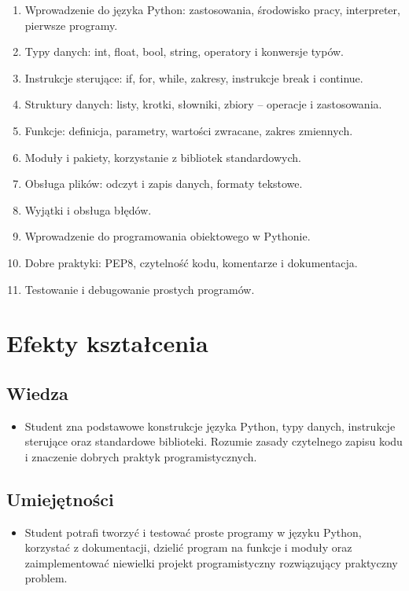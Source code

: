 \documentclass[12pt, a4paper]{article}
\begin{document}
\begin{enumerate}
  \item Wprowadzenie do języka Python: zastosowania, środowisko pracy, interpreter, pierwsze programy.
  \item Typy danych: int, float, bool, string, operatory i konwersje typów.
  \item Instrukcje sterujące: if, for, while, zakresy, instrukcje break i continue.
  \item Struktury danych: listy, krotki, słowniki, zbiory – operacje i zastosowania.
  \item Funkcje: definicja, parametry, wartości zwracane, zakres zmiennych.
  \item Moduły i pakiety, korzystanie z bibliotek standardowych.
  \item Obsługa plików: odczyt i zapis danych, formaty tekstowe.
  \item Wyjątki i obsługa błędów.
  \item Wprowadzenie do programowania obiektowego w Pythonie.
  \item  Dobre praktyki: PEP8, czytelność kodu, komentarze i dokumentacja.
  \item  Testowanie i debugowanie prostych programów.
\end{enumerate}

\section{Efekty kształcenia}

\subsection*{Wiedza}
\begin{itemize}
  \item Student zna podstawowe konstrukcje języka Python, typy danych, instrukcje sterujące oraz standardowe biblioteki. Rozumie zasady czytelnego zapisu kodu i znaczenie dobrych praktyk programistycznych.
\end{itemize}

\subsection*{Umiejętności}
\begin{itemize}
  \item Student potrafi tworzyć i testować proste programy w języku Python, korzystać z dokumentacji, dzielić program na funkcje i moduły oraz zaimplementować niewielki projekt programistyczny rozwiązujący praktyczny problem.
\end{itemize}
\end{document}
